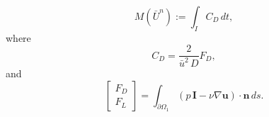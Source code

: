 \begin{test} \label{tst:Drag}
    \begin{equation}
        M(\bar{U}^n) := \int_I\! C_D\, dt,
        \label{eq:DragFunctional}
    \end{equation}
    where
    \begin{equation*}
        C_D = \frac{2}{\bar{u}^2\, D}F_D,
    \end{equation*}
    and
    \begin{equation*}
        \begin{bmatrix} F_D \\ F_L \end{bmatrix} =
            \int_{\partial \Omega_1}\! (p\, \mathbf{I} - \nu \nabla
                \mathbf{u})\cdot \mathbf{n}\, ds.
    \end{equation*}


\end{test}
